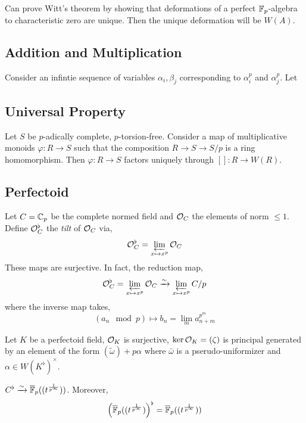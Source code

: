 \documentclass[12pt]{article}
\begin{document}
\begin{rmk}
Can prove Witt's theorem by showing that deformations of a perfect $\mathbb{F}_p$-algebra to characteristic zero are unique. Then the unique deformation will be $W(A)$. 
\end{rmk}

\subsection{Addition and Multiplication}

Consider an infintie sequence of variables $\alpha_i, \beta_j$ corresponding to $\alpha_i^p$ and $\alpha_j^p$. Let 

\subsection{Universal Property}

Let $S$ be $p$-adically complete, $p$-torsion-free. Consider a map of multiplicative monoids $\varphi : R \to S$ such that the composition $R \to S \to S / p$ is a ring homomorphism. Then $\varphi : R \to S$ factors uniquely through $[] : R \to W(R)$.




\subsection{Perfectoid}

Let $C = \mathbb{C}_p$ be the complete normed field and $\mathcal{O}_{C}$ the elements of norm $\le 1$. Define $\mathcal{O}_{C}^\flat$ the \textit{tilt} of $\mathcal{O}_{C}$ via,
\[ \mathcal{O}_{C}^\flat = \varprojlim_{x \mapsto x^p} \mathcal{O}_{C} \]
These maps are surjective. In fact, the reduction map,
\[  \mathcal{O}_{C}^\flat = \varprojlim_{x \mapsto x^p} \mathcal{O}_{C} \xrightarrow{\sim} \varprojlim_{x \mapsto x^p} \strut{C}/p \]
where the inverse map takes,
\[ (a_n \mod p) \mapsto b_n = \lim_m a_{n+m}^{p^m} \]

\begin{lemma}
Let $K$ be a perfectoid field, $\mathcal{O}_{K}$ is surjective, $\ker{\mathcal{O}_{K}} = (\zeta)$ is principal generated by an element of the form $(\tilde{\omega}) + p \alpha$ where $\bar{\omega}$ is a pserudo-uniformizer and $\alpha \in W(K^\flat)^\times$. 
\end{lemma}

\begin{example}
$C^\flat \xrightarrow{\sim} \overline{\mathbb{F}}_p((t^{\frac{1}{p^\infty}}))$. Moreover,
\[ \left( \overline{\mathbb{F}}_p((t^{\frac{1}{p^\infty}}) \right)^\flat = \overline{\mathbb{F}}_p((t^{\frac{1}{p^\infty}})) \]
\end{example}
\end{document}
